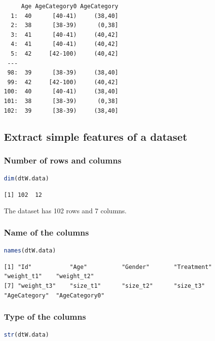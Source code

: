 \documentclass{article}
\begin{document}
\label{}
\begin{verbatim}
     Age AgeCategory0 AgeCategory
  1:  40      [40-41)     (38,40]
  2:  38      [38-39)      (0,38]
  3:  41      [40-41)     (40,42]
  4:  41      [40-41)     (40,42]
  5:  42     [42-100)     (40,42]
 ---                             
 98:  39      [38-39)     (38,40]
 99:  42     [42-100)     (40,42]
100:  40      [40-41)     (38,40]
101:  38      [38-39)      (0,38]
102:  39      [38-39)     (38,40]
\end{verbatim}
\subsection{Extract simple features of a dataset}
\label{sec:orge161a45}
\subsubsection{Number of rows and columns}
\label{sec:orgfb379da}
\begin{lstlisting}[language=r,numbers=none]
dim(dtW.data)
\end{lstlisting}

\label{}
\begin{verbatim}
[1] 102  12
\end{verbatim}


The dataset has 102 rows and 7 columns.
\subsubsection{Name of the columns}
\label{sec:org333c619}
\begin{lstlisting}[language=r,numbers=none]
names(dtW.data)
\end{lstlisting}

\label{}
\begin{verbatim}
[1] "Id"           "Age"          "Gender"       "Treatment"    "weight_t1"    "weight_t2"   
[7] "weight_t3"    "size_t1"      "size_t2"      "size_t3"      "AgeCategory"  "AgeCategory0"
\end{verbatim}
\subsubsection{Type of the columns}
\label{sec:org1fd99a9}
\begin{lstlisting}[language=r,numbers=none]
str(dtW.data)
\end{lstlisting}
\end{document}
